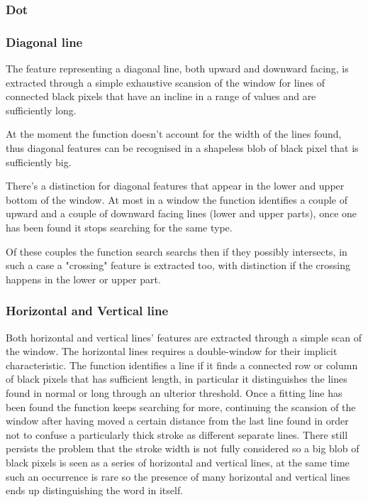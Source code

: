 \documentclass[a4paper,12pt]{article}
\begin{document}
\subsubsection{Dot}

\subsubsection{Diagonal line}
The feature representing a diagonal line, both upward and downward facing, is extracted through a simple exhaustive scansion of the window for lines of connected black pixels that have an incline in a range of values and are sufficiently long.

At the moment the function doesn't account for the width of the lines found, thus diagonal features can be recognised in a shapeless blob of black pixel that is sufficiently big. 
   
There's a distinction for diagonal features that appear in the lower and upper bottom of the window.
At most in a window the function identifies a couple of upward and a couple of downward facing lines (lower and upper parts), once one has been found it stops searching for the same type.

Of these couples the function search searchs then if they possibly intersects, in such a case a "crossing" feature is extracted too, with distinction if the crossing happens in the lower or upper part. 

\subsubsection{Horizontal and Vertical line}
Both horizontal and vertical lines' features are extracted through
a simple scan of the window.
The horizontal lines requires a double-window for their implicit characteristic.
The function identifies a line if it finds a connected row or column of black pixels that has sufficient length, in particular it distinguishes the lines found in normal or long through an ulterior threshold.
Once a fitting line has been found the function keeps searching for more, continuing the scansion of the window after having moved a certain distance from the last line found in order not to confuse a particularly thick stroke as different separate lines.
There still persists the problem that the stroke width is not fully considered so a big blob of black pixels is seen as a series of horizontal and vertical lines, at the same time such an occurrence is rare so the presence of many horizontal and vertical lines ends up distinguishing the word in itself.     
\end{document}
